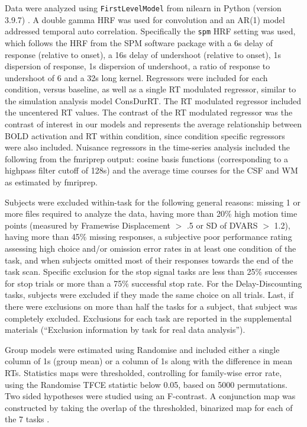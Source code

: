 \documentclass[sn-mathphys,Numbered, super, referee, lineno]{sn-jnl}
\begin{document}
Data were analyzed using \verb+FirstLevelModel+ from nilearn in Python (version 3.9.7) \citep{abrahamMachineLearningNeuroimaging2014}.  A double gamma HRF was used for convolution and an AR(1) model addressed temporal auto correlation.  Specifically the \verb+spm+ HRF setting was used, which follows the HRF from the SPM software package with a 6s delay of response (relative to onset), a 16s delay of undershoot (relative to onset), 1s dispersion of response, 1s dispersion of undershoot, a ratio of response to undershoot of 6 and a 32s long kernel.  Regressors were included for each condition, versus baseline, as well as a single RT modulated regressor, similar to the simulation analysis model ConsDurRT.  The RT modulated regressor included the uncentered RT values.  The contrast of the RT modulated regressor was the contrast of interest in our models and represents the average relationship between BOLD activation and RT within condition, since condition specific regressors were also included.  Nuisance regressors in the time-series analysis included the following from the fmriprep output: cosine basis functions (corresponding to a highpass filter cutoff of 128s) and the average time courses for the CSF and WM as estimated by fmriprep. 

Subjects were excluded within-task for the following general reasons: missing 1 or more files required to analyze the data, having more than 20\% high motion time points (measured by Framewise Displacement $>$ .5 or SD of DVARS $>$ 1.2), having more than 45\% missing responses, a subjective poor performance rating assessing high choice and/or omission error rates in at least one condition of the task, and when subjects omitted most of their responses towards the end of the task scan.  Specific exclusion for the stop signal tasks are less than 25\% successes for stop trials or more than a 75\% successful stop rate.  For the Delay-Discounting tasks, subjects were excluded if they made the same choice on all trials.  Last, if there were exclusions on more than half the tasks for a subject, that subject was completely excluded. Exclusions for each task are reported in the supplemental materials (``Exclusion information by task for real data analysis''). 

Group models were estimated using Randomise \citep{smith2009} and included either a single column of 1s (group mean) or a column of 1s along with the difference in mean RTs. Statistics maps were thresholded, controlling for family-wise error rate, using the Randomise TFCE statistic below 0.05, based on 5000 permutations.  Two sided hypotheses were studied using an F-contrast.  A conjunction map was constructed by taking the overlap of the thresholded, binarized map for each of the 7 tasks \citep{nichols_valid_2005}.
\end{document}
